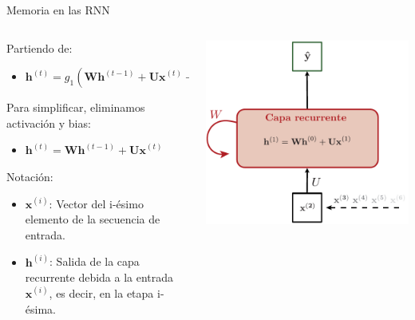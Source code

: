 \documentclass[aspectratio=169]{beamer}
\begin{document}
\begin{frame}{Memoria en las RNN}

	\begin{columns}
		\begin{column}{0.5\textwidth}
			Partiendo de:
			\begin{itemize}
				\item $\mathbf{h}^{(t)} = g_{1}(\mathbf{Wh}^{(t-1)}+\mathbf{Ux}^{(t)}+\mathbf{b}_{h})$
			\end{itemize}			
			Para simplificar, eliminamos activación y bias:
			\begin{itemize}
				\item $\mathbf{h}^{(t)} = \mathbf{Wh}^{(t-1)}+\mathbf{Ux}^{(t)}$
			\end{itemize}
			\vspace{1em}
			Notación:
			\begin{itemize}
			  \item $\mathbf{x}^{(i)}$: Vector del i-ésimo elemento de la secuencia de entrada.
			  \item $\mathbf{h}^{(i)}$: Salida de la capa recurrente debida a la entrada $\mathbf{x}^{(i)}$, es decir, en la etapa i-ésima.
			\end{itemize}
		\end{column}

		\begin{column}{0.5\textwidth}
			\begin{center}
				\includegraphics[width=.8\textwidth]{imgs/tema4/rnn/Memoria2.pdf}
			\end{center}
		\end{column}
	\end{columns}

\end{frame}
\end{document}
